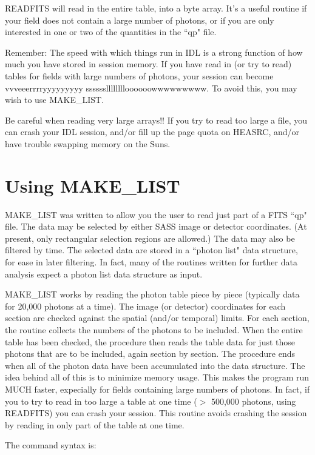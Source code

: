 READFITS will read in the entire table, into a byte array. It's a useful
routine if your field does not contain a large number of photons, or if you are
only interested in one or two of the quantities in the ``qp" file.
 
Remember: The speed with which things run in IDL is a strong function of how
much you have stored in session memory. If you have read in (or try to read)
tables for fields with large numbers of photons, your session can become
vvveeerrrryyyyyyyyy sssssslllllllloooooowwwwwwwww. To avoid this, you may wish
to use MAKE{\_}LIST.
 
Be careful when reading very large arrays!! If you try to read too large a
file, you can crash your IDL session, and/or fill up the page quota on HEASRC,
and/or have trouble swapping memory on the Suns.
 

\section{Using MAKE{\_}LIST}
 
MAKE{\_}LIST was written to allow you the user to read just part of a FITS ``qp"
file. The data may be selected by either SASS image or detector coordinates.
(At present, only rectangular selection regions are allowed.) The data may also
be filtered by time. The selected data are stored in a ``photon list" data
structure, for ease in later filtering. In fact, many of the routines written
for further data analysis expect a photon list data structure as input.
 
MAKE{\_}LIST works by reading the photon table piece by piece (typically data for
20,000 photons at a time). The image (or detector) coordinates for each section
are checked against the spatial (and/or temporal) limits. For each section, the
routine collects the numbers of the photons to be  included. When the entire
table has been checked, the procedure then reads the table data for just those
photons that are to be included, again section by section. The procedure ends
when all of the photon data have  been accumulated into the data structure. The
idea behind all of this is to minimize memory usage. This makes the program run
MUCH faster, expecially for fields containing large numbers of photons. In
fact, if you to try to read in too large a table at one time ($>$ 500,000
photons, using READFITS) you can crash your session. This routine avoids
crashing the session by reading in only part of the table at one time.
 
The command syntax is:

